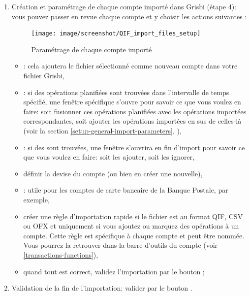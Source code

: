 \begin{enumerate}
	\item Création et paramétrage de chaque compte importé dans Grisbi (étape 4): vous pouvez passer en revue chaque compte et y choisir les actions suivantes	:
	\begin{figure}[htbp]
		\begin{center}
		\texttt{[image: image/screenshot/QIF\_import\_files\_setup]}
		\end{center}
		\caption{Paramétrage de chaque compte importé}
		\label{QIF-import-files-setup-img}
	\end{figure}
		\begin{itemize}
			\item {}: cela ajoutera le fichier sélectionné comme nouveau compte dans votre fichier Grisbi,
			\item {}: si des opérations planifiées sont trouvées dans l'intervalle de temps spécifié, une fenêtre spécifique s'ouvre pour savoir ce que vous voulez en faire: soit fusionner ces opérations planifiées avec les opérations importées correspondantes, soit ajouter les opérations importées en sus de celles-là (voir la section \vref{setup-general-import-parameters}, ),
			\item {}: si des  sont trouvées, une fenêtre s'ouvrira en fin d'import pour savoir ce que vous voulez en faire: soit les ajouter, soit les ignorer,
			\item définir la devise du compte (ou bien en créer une nouvelle),
			\item {}: utile pour les comptes de carte bancaire de la Banque Postale, par exemple,
			\item créer une règle d'importation rapide si le fichier est au format \gls{QIF}, \gls{CSV} ou \gls{OFX} et uniquement si vous ajoutez ou marquez des opérations à un compte. Cette règle est spécifique à chaque compte et peut être nommée. Vous pourrez la retrouver dans la barre d'outils du compte (voir \vref{transactions-functions}),%
			\item quand tout est correct, validez l'importation par le bouton ;
		\end{itemize}
	\item Validation de la fin de l'importation: valider par le bouton .
\end{enumerate}

